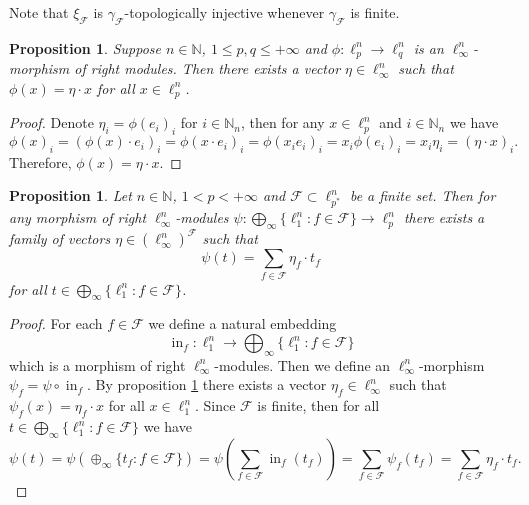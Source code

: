\documentclass[12pt]{article}
\newtheorem{proposition}[theorem]{Proposition}
\begin{document}
Note that $\xi_{\mathcal{F}}$ is $\gamma_{\mathcal{F}}$-topologically injective
whenever $\gamma_{\mathcal{F}}$ is finite.

\begin{proposition}\label{LinfnMorphlpntolqnCharac}
    Suppose $n\in\mathbb{N}$, $1\leq p,q\leq +\infty$ 
    and $\phi:\ell_{p}^n\to \ell_{q}^n$ is an $\ell_{\infty}^n$-morphism of 
    right modules. Then there exists a vector $\eta\in\ell_{\infty}^n$ such 
    that $\phi(x)=\eta\cdot x$ for all $x\in \ell_{p}^n$.
\end{proposition}
\begin{proof}
    Denote $\eta_i=\phi(e_i)_i$ for $i\in\mathbb{N}_n$, then for 
    any $x\in\ell_{p}^n$ and $i\in\mathbb{N}_n$ we have
    \[
        \phi(x)_i
        =(\phi(x)\cdot e_i)_i
        =\phi(x\cdot e_i)_i
        =\phi(x_i e_i)_i
        =x_i\phi(e_i)_i
        =x_i\eta_i
        =(\eta\cdot x)_i.
    \]
    Therefore, $\phi(x)=\eta\cdot x$.
\end{proof}

\begin{proposition}\label{ExtMorphSuml1ntlpnCharac}
    Let $n\in\mathbb{N}$, $1<p<+\infty$ and $\mathcal{F}\subset \ell_{p^*}^n$
    be a finite set. Then for any morphism of right $\ell_{\infty}^n$-modules
    $\psi:\bigoplus_{\infty}\{\ell_1^n : f\in\mathcal{F}\}\to\ell_p^n$ 
    there exists a family of vectors $\eta\in(\ell_{\infty}^n)^\mathcal{F}$ 
    such that
    \[
        \psi(t)=\sum_{f\in\mathcal{F}} \eta_f \cdot t_f
    \]
    for all $t\in \bigoplus_{\infty}\{ \ell_1^n:f\in\mathcal{F}\}$.
\end{proposition}
\begin{proof}
    For each $f\in\mathcal{F}$  we define a natural embedding
    \[
        \operatorname{in}_f:
        \ell_1^n\to \bigoplus_\infty\{ \ell_1^n : f\in\mathcal{F}\}
    \]
    which is a morphism of right $\ell_{\infty}^n$-modules. Then we define 
    an $\ell_{\infty}^n$-morphism $\psi_f=\psi\circ \operatorname{in}_f$. 
    By proposition \ref{LinfnMorphlpntolqnCharac} there exists 
    a vector $\eta_f\in\ell_{\infty}^n$ such that $\psi_f(x)=\eta_f\cdot x$ 
    for all $x\in\ell_1^n$. Since $\mathcal{F}$ is finite, then for 
    all $t\in \bigoplus_\infty\{ \ell_1^n : f\in \mathcal{F}\}$ we have
    \[
        \psi(t)
        =\psi(\oplus_\infty\{ t_f : f\in\mathcal{F}\})
        =\psi\left(\sum_{f\in\mathcal{F}} \operatorname{in}_f(t_f)\right)
        =\sum_{f\in\mathcal{F}}\psi_f(t_f)
        =\sum_{f\in\mathcal{F}} \eta_f\cdot t_f.
    \]
\end{proof}
\end{document}
